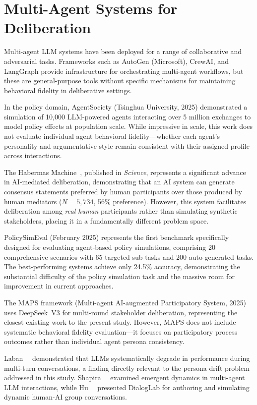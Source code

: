 \section{Multi-Agent Systems for Deliberation}

Multi-agent LLM systems have been deployed for a range of collaborative and adversarial tasks. Frameworks such as AutoGen (Microsoft), CrewAI, and LangGraph provide infrastructure for orchestrating multi-agent workflows, but these are general-purpose tools without specific mechanisms for maintaining behavioral fidelity in deliberative settings.

In the policy domain, AgentSociety (Tsinghua University, 2025) demonstrated a simulation of 10,000 LLM-powered agents interacting over 5 million exchanges to model policy effects at population scale. While impressive in scale, this work does not evaluate individual agent behavioral fidelity---whether each agent's personality and argumentative style remain consistent with their assigned profile across interactions.

The Habermas Machine~\cite{bakker2024habermas}, published in \textit{Science}, represents a significant advance in AI-mediated deliberation, demonstrating that an AI system can generate consensus statements preferred by human participants over those produced by human mediators ($N=5{,}734$, 56\% preference). However, this system facilitates deliberation among \textit{real human} participants rather than simulating synthetic stakeholders, placing it in a fundamentally different problem space.

PolicySimEval (February 2025) represents the first benchmark specifically designed for evaluating agent-based policy simulations, comprising 20 comprehensive scenarios with 65 targeted sub-tasks and 200 auto-generated tasks. The best-performing systems achieve only 24.5\% accuracy, demonstrating the substantial difficulty of the policy simulation task and the massive room for improvement in current approaches.

The MAPS framework (Multi-agent AI-augmented Participatory System, 2025) uses DeepSeek~V3 for multi-round stakeholder deliberation, representing the closest existing work to the present study. However, MAPS does not include systematic behavioral fidelity evaluation---it focuses on participatory process outcomes rather than individual agent persona consistency.

Laban~\etal~\cite{laban2025lost} demonstrated that LLMs systematically degrade in performance during multi-turn conversations, a finding directly relevant to the persona drift problem addressed in this study. Shapira~\etal~\cite{shapira2026chaos} examined emergent dynamics in multi-agent LLM interactions, while Hu~\etal~\cite{hu2025dialoglab} presented DialogLab for authoring and simulating dynamic human-AI group conversations.

